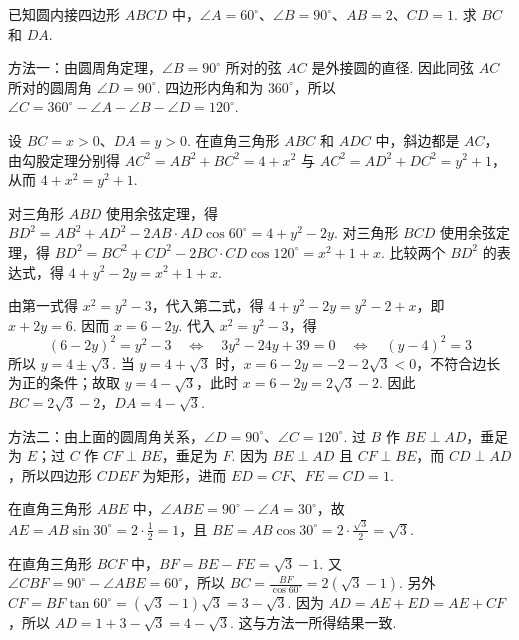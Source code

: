\begin{problem}
已知圆内接四边形 \(ABCD\) 中，\(\angle A=60^\circ\)、\(\angle B=90^\circ\)、\(AB=2\)、\(CD=1\). 求 \(BC\) 和 \(DA\).

\end{problem}

\begin{solution}
方法一：由圆周角定理，\(\angle B=90^\circ\) 所对的弦 \(AC\) 是外接圆的直径. 因此同弦 \(AC\) 所对的圆周角 \(\angle D=90^\circ\). 四边形内角和为 \(360^\circ\)，所以 \(\angle C=360^\circ-\angle A-\angle B-\angle D=120^\circ\).

设 \(BC=x>0\)、\(DA=y>0\). 在直角三角形 \(ABC\) 和 \(ADC\) 中，斜边都是 \(AC\)，由勾股定理分别得 \(AC^2=AB^2+BC^2=4+x^2\) 与 \(AC^2=AD^2+DC^2=y^2+1\)，从而
\(4+x^2=y^2+1\).

对三角形 \(ABD\) 使用余弦定理，得 \(BD^2=AB^2+AD^2-2AB\cdot AD\cos60^\circ=4+y^2-2y\). 对三角形 \(BCD\) 使用余弦定理，得 \(BD^2=BC^2+CD^2-2BC\cdot CD\cos120^\circ=x^2+1+x\). 比较两个 \(BD^2\) 的表达式，得 \(4+y^2-2y=x^2+1+x\).

由第一式得 \(x^2=y^2-3\)，代入第二式，得 \(4+y^2-2y=y^2-2+x\)，即 \(x+2y=6\). 因而 \(x=6-2y\). 代入 \(x^2=y^2-3\)，得
\[
(6-2y)^2=y^2-3
\quad\Longleftrightarrow\quad
3y^2-24y+39=0
\quad\Longleftrightarrow\quad
(y-4)^2=3
\]
所以 \(y=4\pm\sqrt3\). 当 \(y=4+\sqrt3\) 时，\(x=6-2y=-2-2\sqrt3<0\)，不符合边长为正的条件；故取 \(y=4-\sqrt3\)，此时 \(x=6-2y=2\sqrt3-2\). 因此
\(BC=2\sqrt3-2\)，\(DA=4-\sqrt3\).

方法二：由上面的圆周角关系，\(\angle D=90^\circ\)、\(\angle C=120^\circ\). 过 \(B\) 作 \(BE\perp AD\)，垂足为 \(E\)；过 \(C\) 作 \(CF\perp BE\)，垂足为 \(F\). 因为 \(BE\perp AD\) 且 \(CF\perp BE\)，而 \(CD\perp AD\)，所以四边形 \(CDEF\) 为矩形，进而 \(ED=CF\)、\(FE=CD=1\).


在直角三角形 \(ABE\) 中，\(\angle ABE=90^\circ-\angle A=30^\circ\)，故
\(AE=AB\sin30^\circ=2\cdot\frac12=1\)，且 \(BE=AB\cos30^\circ=2\cdot\frac{\sqrt3}{2}=\sqrt3\).

在直角三角形 \(BCF\) 中，\(BF=BE-FE=\sqrt3-1\). 又 \(\angle CBF=90^\circ-\angle ABE=60^\circ\)，所以
\(BC=\frac{BF}{\cos60^\circ}=2(\sqrt3-1)\). 另外
\(CF=BF\tan60^\circ=(\sqrt3-1)\sqrt3=3-\sqrt3\). 因为 \(AD=AE+ED=AE+CF\)，所以 \(AD=1+3-\sqrt3=4-\sqrt3\). 这与方法一所得结果一致.
\end{solution}


